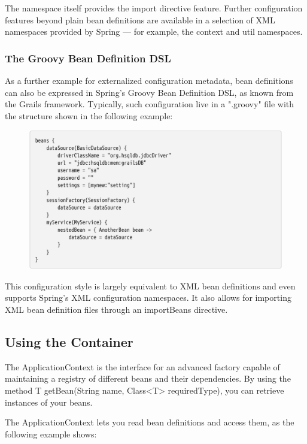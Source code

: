 The namespace itself provides the import directive feature. Further configuration features beyond
plain bean definitions are available in a selection of XML namespaces provided by Spring — for
example, the context and util namespaces.

\subsubsection{The Groovy Bean Definition DSL}

As a further example for externalized configuration metadata, bean definitions can also be
expressed in Spring’s Groovy Bean Definition DSL, as known from the Grails framework. Typically,
such configuration live in a ".groovy" file with the structure shown in the following example:

\newpage
\begin{figure}[ht]
\centering
\includegraphics[width=1\linewidth]{./Figure/IMG_code_6.png}
\end{figure}

This configuration style is largely equivalent to XML bean definitions and even supports Spring’s
XML configuration namespaces. It also allows for importing XML bean definition files through an
importBeans directive.

\subsection{Using the Container}

The ApplicationContext is the interface for an advanced factory capable of maintaining a registry of
different beans and their dependencies. By using the method T getBean(String name, Class<T>
requiredType), you can retrieve instances of your beans.


The ApplicationContext lets you read bean definitions and access them, as the following example
shows:

